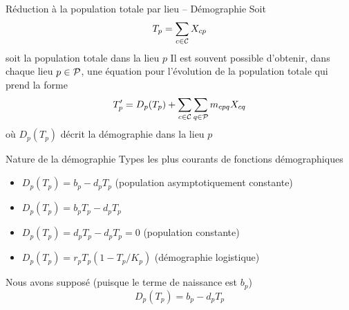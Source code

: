 \documentclass[aspectratio=169]{beamer}\usepackage[]{graphicx}\usepackage[]{xcolor}
\begin{document}




\begin{frame}{Réduction à la population totale par lieu -- Démographie}
Soit 
\[
	T_p = \sum_{c\in\C}X_{cp}
\]
soit la population totale dans la lieu $p$
\vfill
Il est souvent possible d'obtenir, dans chaque lieu $p\in\P$, une équation pour l'évolution de la population totale qui prend la forme
\begin{equation}\label{eq:dT_total_population}
	T_p' = 
	D_p(T_p)+\sum_{c\in\C}\sum_{q\in\P}m_{cpq}X_{cq}
\end{equation}
où $D_p(T_p)$ décrit la démographie dans la lieu $p$
\end{frame}

\begin{frame}{Nature de la démographie}
	Types les plus courants de fonctions démographiques
	\begin{itemize}
		\item $D_p(T_p)=b_p-d_pT_p$ (population asymptotiquement constante)
		\item $D_p(T_p)=b_pT_p-d_pT_p$ 
		\item $D_p(T_p)=d_pT_p-d_pT_p=0$ (population constante)
		\item $D_p(T_p)=r_pT_p(1-T_p/K_p)$ (démographie logistique)
	\end{itemize}
	\vfill
	Nous avons supposé (puisque le terme de naissance est $b_p$) 
	\begin{equation}\label{eq:demography_function}
		D_p(T_p)=b_p-d_pT_p
	\end{equation}
\end{frame}
\end{document}
